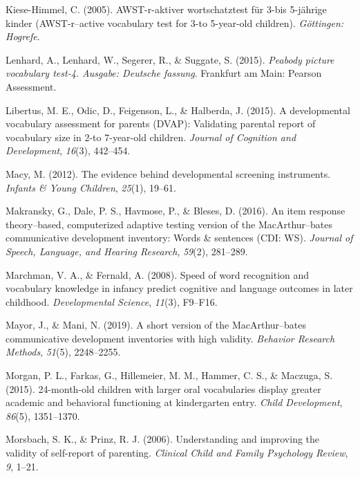 \documentclass[
  man,floatsintext]{apa6}
\newlength{\cslhangindent}
\newlength{\cslentryspacingunit} %
\newenvironment{CSLReferences}[2] %
 {%
  \setlength{\parindent}{0pt}
  \ifodd #1
  \let\oldpar\par
  \def\par{\hangindent=\cslhangindent\oldpar}
  \fi
  \setlength{\parskip}{#2\cslentryspacingunit}
 }%
 {}
\begin{document}
\begin{CSLReferences}{1}{0}
\leavevmode{}%
Kiese-Himmel, C. (2005). AWST-r-aktiver wortschatztest f{ü}r 3-bis 5-j{ä}hrige kinder (AWST-r--active vocabulary test for 3-to 5-year-old children). \emph{G{ö}ttingen: Hogrefe}.

\leavevmode{}%
Lenhard, A., Lenhard, W., Segerer, R., \& Suggate, S. (2015). \emph{Peabody picture vocabulary test-4. Ausgabe: Deutsche fassung}. Frankfurt am Main: Pearson Assessment.

\leavevmode{}%
Libertus, M. E., Odic, D., Feigenson, L., \& Halberda, J. (2015). A developmental vocabulary assessment for parents (DVAP): Validating parental report of vocabulary size in 2-to 7-year-old children. \emph{Journal of Cognition and Development}, \emph{16}(3), 442--454.

\leavevmode{}%
Macy, M. (2012). The evidence behind developmental screening instruments. \emph{Infants \& Young Children}, \emph{25}(1), 19--61.

\leavevmode{}%
Makransky, G., Dale, P. S., Havmose, P., \& Bleses, D. (2016). An item response theory--based, computerized adaptive testing version of the MacArthur--bates communicative development inventory: Words \& sentences (CDI: WS). \emph{Journal of Speech, Language, and Hearing Research}, \emph{59}(2), 281--289.

\leavevmode{}%
Marchman, V. A., \& Fernald, A. (2008). Speed of word recognition and vocabulary knowledge in infancy predict cognitive and language outcomes in later childhood. \emph{Developmental Science}, \emph{11}(3), F9--F16.

\leavevmode{}%
Mayor, J., \& Mani, N. (2019). A short version of the MacArthur--bates communicative development inventories with high validity. \emph{Behavior Research Methods}, \emph{51}(5), 2248--2255.

\leavevmode{}%
Morgan, P. L., Farkas, G., Hillemeier, M. M., Hammer, C. S., \& Maczuga, S. (2015). 24-month-old children with larger oral vocabularies display greater academic and behavioral functioning at kindergarten entry. \emph{Child Development}, \emph{86}(5), 1351--1370.

\leavevmode{}%
Morsbach, S. K., \& Prinz, R. J. (2006). Understanding and improving the validity of self-report of parenting. \emph{Clinical Child and Family Psychology Review}, \emph{9}, 1--21.


\end{CSLReferences}
\end{document}
